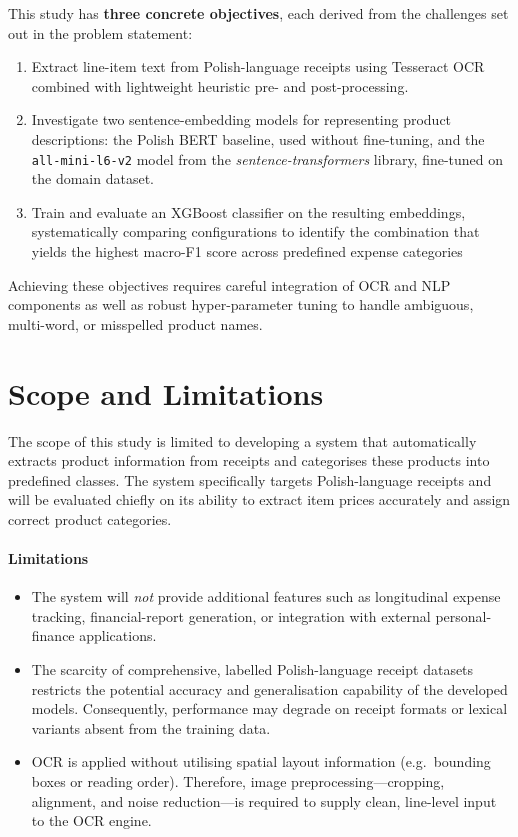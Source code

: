 \documentclass{SGGW-thesis-EN}
\begin{document}
This study has \textbf{three concrete objectives}, each derived from the challenges set out in the problem statement:

\begin{enumerate}
  \item Extract line-item text from Polish-language receipts using Tesseract OCR combined with
        lightweight heuristic pre- and post-processing.

  \item Investigate two sentence-embedding models for representing product descriptions:
        the Polish BERT baseline, used without fine-tuning, and the \texttt{all-mini-l6-v2} model from
        the \emph{sentence-transformers} library, fine-tuned on the domain dataset.

  \item Train and evaluate an XGBoost classifier on the resulting embeddings, systematically
        comparing configurations to identify the combination that yields the highest macro-F1
        score across predefined expense categories
\end{enumerate}
\noindent
Achieving these objectives requires careful integration of OCR and NLP components as well as robust
hyper-parameter tuning to handle ambiguous, multi-word, or misspelled product names.

\section{Scope and Limitations}
The scope of this study is limited to developing a system that automatically extracts product information
from receipts and categorises these products into predefined classes.
The system specifically targets Polish-language receipts and will be evaluated chiefly on its ability to
extract item prices accurately and assign correct product categories.

\paragraph{Limitations}

\begin{itemize}
  \item The system will \emph{not} provide additional features such as longitudinal expense tracking,
        financial-report generation, or integration with external personal-finance applications.
  \item The scarcity of comprehensive, labelled Polish-language receipt datasets restricts the potential
        accuracy and generalisation capability of the developed models.
        Consequently, performance may degrade on receipt formats or lexical variants absent from the
        training data.
  \item OCR is applied without utilising spatial layout information (e.g.\ bounding boxes or reading order).
        Therefore, image preprocessing—cropping, alignment, and noise reduction—is required to supply
        clean, line-level input to the OCR engine.
\end{itemize}
\end{document}
